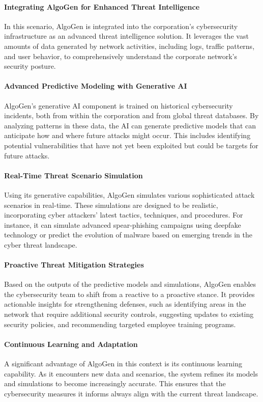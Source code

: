 \documentclass{article}
\begin{document}
\paragraph{Integrating AlgoGen for Enhanced Threat Intelligence}
In this scenario, AlgoGen is integrated into the corporation's cybersecurity infrastructure as an advanced threat intelligence solution. It leverages the vast amounts of data generated by network activities, including logs, traffic patterns, and user behavior, to comprehensively understand the corporate network's security posture.

\paragraph{Advanced Predictive Modeling with Generative AI}
AlgoGen’s generative AI component is trained on historical cybersecurity incidents, both from within the corporation and from global threat databases. By analyzing patterns in these data, the AI can generate predictive models that can anticipate how and where future attacks might occur. This includes identifying potential vulnerabilities that have not yet been exploited but could be targets for future attacks.

\paragraph{Real-Time Threat Scenario Simulation}
Using its generative capabilities, AlgoGen simulates various sophisticated attack scenarios in real-time. These simulations are designed to be realistic, incorporating cyber attackers' latest tactics, techniques, and procedures. For instance, it can simulate advanced spear-phishing campaigns using deepfake technology or predict the evolution of malware based on emerging trends in the cyber threat landscape.

\paragraph{Proactive Threat Mitigation Strategies}
Based on the outputs of the predictive models and simulations, AlgoGen enables the cybersecurity team to shift from a reactive to a proactive stance. It provides actionable insights for strengthening defenses, such as identifying areas in the network that require additional security controls, suggesting updates to existing security policies, and recommending targeted employee training programs.

\paragraph{Continuous Learning and Adaptation}
A significant advantage of AlgoGen in this context is its continuous learning capability. As it encounters new data and scenarios, the system refines its models and simulations to become increasingly accurate. This ensures that the cybersecurity measures it informs always align with the current threat landscape.
\end{document}
